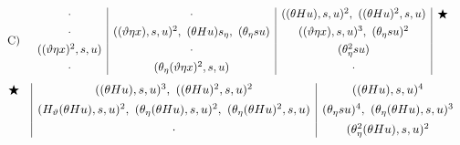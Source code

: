 
\[
\begin{array}{r@{\quad}c}
\text{C)}&
\begin{array}{c|c|c|c}
\cdot&\cdot&((\theta Hu),s,u)^2,\ ((\theta Hu)^2,s,u)&\bigstar\\[0.35em]
\cdot&((\vartheta\eta x),s,u)^2,\ (\theta Hu)s_\eta,\ (\theta_\eta su)&((\vartheta\eta x),s,u)^3,\ (\theta_\eta su)^2&\\[0.35em]
((\vartheta\eta x)^2,s,u)&\cdot&(\theta_\eta^2su)&\\[0.35em]
\cdot&(\theta_\eta(\vartheta\eta x)^2,s,u)&\cdot&
\end{array}
\end{array}
\]
\[
\begin{array}{c@{\quad}|c|c}
\bigstar&((\theta Hu),s,u)^3,\ ((\theta Hu)^2,s,u)^2&((\theta Hu),s,u)^4\\[0.45em]
&(H_\vartheta(\theta Hu),s,u)^2,\ (\theta_\eta(\theta Hu),s,u)^2,\ (\theta_\eta(\theta Hu)^2,s,u)&(\theta_\eta su)^4,\ (\theta_\eta(\theta Hu),s,u)^3\\[0.45em]
&\cdot&(\theta_\eta^2(\theta Hu),s,u)^2
\end{array}
\]

